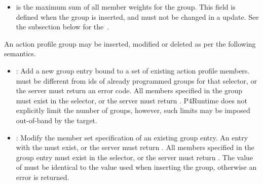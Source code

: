 \documentclass[11pt]{article}
\begin{document}
{\begin{itemize}
\item{}
 is the maximum sum of all member weights for the group. This field
is defined when the group is inserted, and must not be changed in a
 update. See the subsection below for the~.%
\end{itemize}%

\noindent{}An action profile group may be inserted, modified or deleted as per the
following semantics.%

\begin{itemize}[noitemsep,topsep=\mdcompacttopsep]%

\item{}: Add a new group entry bound to a set of existing action profile
members.  must be different from ids of already programmed
groups for that selector, or the server must return an  error
code.  All members specified in the group must exist in the selector, or the
server must return . P4Runtime does not explicitly limit the number
of groups, however, such limits may be imposed out-of-band by the target.%

\item{}: Modify the member set specification of an existing group entry. An
entry with the  must exist, or the server must return
. All members specified in the group entry must exist in the
selector, or the server must return . The value of  must
be identical to the value used when inserting the group, otherwise an
 error is returned.%


\end{itemize}}
\end{document}
